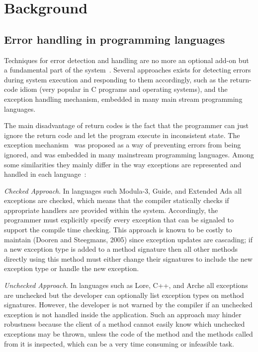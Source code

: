 \documentclass[conference]{IEEEtran}
\begin{document}
\section{Background}

\subsection{Error handling in programming languages}

Techniques for error detection and handling are no more an optional add-on but a fundamental part of the system~\cite{bruntink2006discovering}. Several approaches exists for detecting errors during system execution and responding to them 
accordingly, such as the return-code idiom (very popular in C programs and operating systems), and the exception handling mechanism, embedded in many main stream programming languages.

The main disadvantage of return codes is the fact that the programmer can just ignore the return code and let the program execute in inconsistent state. The exception mechanism~\cite{goodenough1975exception} was proposed as a way of preventing errors from being ignored, and was embedded in many mainstream programming languages. Among some similarities they mainly differ in the way exceptions are represented and handled in each language~\cite{garcia2001comparative}: 

\noindent\emph{Checked Approach}. In languages such Modula-3, Guide, and Extended Ada all exceptions are checked, which means that the compiler statically checks if appropriate handlers are provided within the system. Accordingly, the programmer must explicitly specify every exception that can be signaled to support the compile time checking. This approach is known to be costly to maintain (Dooren and Steegmans, 2005) since exception updates are cascading; if a new exception type is added to a method signature then all other methods directly using this method must either change their 
signatures to include the new exception type or handle the new exception. 

\noindent\emph{Unchecked Approach}. In languages such as Lore, C++, and Arche all exceptions are unchecked but the developer can optionally list exception types on method signatures. However, the developer is not warned by the compiler if an unchecked exception is not handled inside the application. Such an approach may hinder robustness because the client of a method cannot easily know which unchecked exceptions may be thrown, unless the code of the method and the methods called from it is inspected, which can be a very time consuming or infeasible task.
\end{document}
